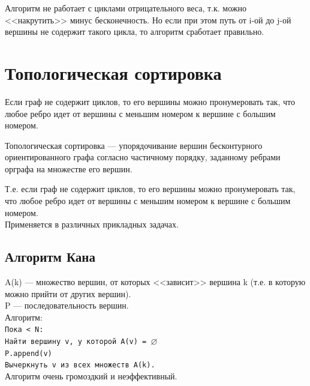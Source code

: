 Алгоритм не работает с циклами отрицательного веса, т.к. можно <<накрутить>> минус бесконечность. Но если при этом путь от i-ой до j-ой вершины не содержит такого цикла, то алгоритм сработает правильно.
\section{Топологическая сортировка}
Если граф не содержит циклов, то его вершины можно пронумеровать так, что любое ребро идет от вершины с меньшим номером к вершине с большим номером.

\textsf{Топологическая сортировка} — упорядочивание вершин бесконтурного ориентированного графа согласно частичному порядку, заданному ребрами орграфа на множестве его вершин.

Т.е. если граф не содержит циклов, то его вершины можно пронумеровать так, что любое ребро идет от вершины с меньшим номером к вершине с большим номером.\\
Применяется в различных прикладных задачах. 

\subsection{Алгоритм Кана}
\noindent A(k) --- множество вершин, от которых <<зависит>> вершина k (т.е. в которую можно прийти от других вершин).\\P --- последовательность вершин.\\
Алгоритм:\\
\texttt{Пока  < N:\\
\phantom{\tab }Найти вершину v, у которой A(v) = $\varnothing$ \\%
\phantom{\tab }P.append(v)\\
\phantom{\tab }Вычеркнуть v из всех множеств A(k).\\}
Алгоритм очень громоздкий и неэффективный.

